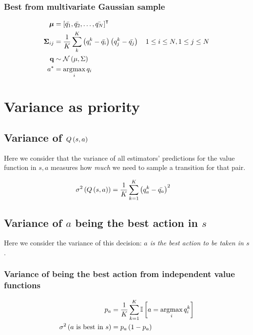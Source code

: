 \documentclass[10pt]{article}
\begin{document}
\subsubsection{Best from multivariate Gaussian sample}
\begin{align*}
	\tensor{\mu}         & = \trans{\left[ \bar{q_1}, \bar{q_2}, \ldots, \bar{q_N} \right]}                                                         \\
	\tensor{\Sigma}_{ij} & = \frac{1}{K}\sum_{k}^{K}\left(q^k_i -\bar{q_i}\right) \left( q^k_j -\bar{q_j}\right) \quad 1 \le i \le N, 1 \le j \le N \\
	\mathbf{q}           & \sim \func[\mathcal{N}]{\mu, \Sigma}                                                                                     \\
	a^*                  & = \argmax{i} q_i
\end{align*}


\section{Variance as priority}

\subsection{Variance of $\func[Q]{s,a}$}

Here we consider that the variance of all estimators' predictions for the value
function in $s, a$ measures how \emph{much} we need to sample a transition for
that pair.

\begin{align}
	\func[\sigma^2]{\func[Q]{s,a}} & =
	\frac{1}{K}\sum_{k=1}^{K} \left(q^k_a - \bar{q_a}\right)^2
\end{align}

\subsection{Variance of $a$ being the best action in $s$}

Here we consider the variance of this decision:
\emph{$a$ is the best action to be taken in $s$}.

\subsubsection{Variance of being the best action from independent value functions}

\begin{align}
	p_a                                     & = \frac{1}{K}\sum_{k=1}^{K}
	\iverson{a = \argmax{i} q^k_i }                                       \\
	\func[\sigma^2]{a\text{ is best in } s} & = p_a \left(1 - p_a\right)
\end{align}
\end{document}
